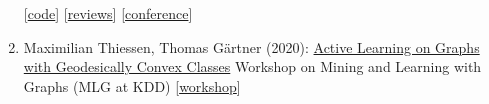 \documentclass{scrartcl}
\begin{document}
\begin{enumerate}
{[\href{https://github.com/pwelke/homcount}{code}]
[\href{https://openreview.net/forum?id=8GJyW4i2oST}{reviews}]
[\href{https://pwelke.github.io/http://log2022.logconference.org/}{conference}]
}
\item
\label{thiessen2020active}
Maximilian Thiessen, Thomas Gärtner (2020):\newline
\href{https://pwelke.github.io/}{Active Learning on Graphs with Geodesically Convex Classes}\newline
Workshop on Mining and Learning with Graphs (MLG at KDD)\newline
{\footnotesize
[\href{https://mlg-europe.github.io/2022/}{workshop}]
}
\seti
\end{enumerate}
\end{document}
